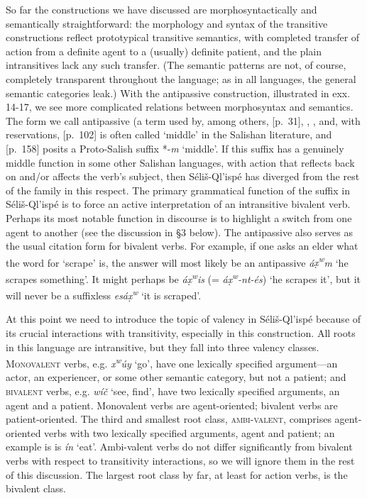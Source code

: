 \documentclass[output=paper,colorlinks,citecolor=brown]{langscibook}
\begin{document}
So far the constructions we have discussed are morphosyntactically and
semantically straightforward: the morphology and syntax of the
transitive constructions reflect prototypical transitive semantics,
with completed transfer of action from a definite agent to a (usually)
definite patient, and the plain intransitives lack any such transfer.
(The semantic patterns are not, of course, completely transparent
throughout the language; as in all languages, the general semantic
categories leak.)  With the antipassive construction, illustrated in
exx. 14-17, we see more complicated relations between morphosyntax and
semantics.  The form we call antipassive (a term used by, among
others, \cite{Kroeber:1999}[p.~31], \cite{Darnell:1990}, \cite{Gerdts:1993}, and,
with reservations, \cite{Thompson&Thompson:1992}[p.~102] is often
called `middle' in the Salishan literature, and \cite{Newman:1980}[p.~158]
posits a Proto-Salish suffix *-\emph{m} `middle'.  If this suffix has a
genuinely middle function in some other Salishan languages, with
action that reflects back on and/or affects the verb's subject, then
S\'eli\v{s}-Ql'isp\'e has diverged from the rest of the family in this
respect.  The primary grammatical function of the suffix in
S\'eli\v{s}-Ql'isp\'e is to force an active interpretation of an
intransitive bivalent verb.  Perhaps its most notable function in
discourse is to highlight a switch from one agent to another (see the
discussion in \S 3 below).  The antipassive also serves as the usual
citation form for bivalent verbs.  For example, if one asks an elder
what the word for `scrape' is, the answer will most likely be an
antipassive \emph{\textglotstop\'a{\d{x}\textsuperscript w}m} `he
scrapes something'.  It might perhaps be \emph{\textglotstop\'a{\d{x}\textsuperscript w}is} (= \emph{\textglotstop\'a{\d{x}\textsuperscript w}-nt-\'es}) `he scrapes it',
but it will never be a suffixless \emph{es\textglotstop\'a\d{x}\textsuperscript w} `it is scraped'.

At this point we need to introduce the topic of valency in
S\'eli\v{s}-Ql'isp\'e because of its crucial interactions with
transitivity, especially in this construction.  All roots in this
language are intransitive, but they fall into three valency
classes. \textsc{Monovalent} verbs, e.g. \emph{x\textsuperscript w\'uy}
`go', have one lexically specified argument---an actor, an
experiencer, or some other semantic category, but not a patient; and
\textsc{bivalent} verbs, e.g. \emph{w\'i\v{c}} `see, find', have two
lexically specified arguments, an agent and a patient.  Monovalent
verbs are agent-oriented; bivalent verbs are patient-oriented.  The
third and smallest root class, \textsc{ambi-valent}, comprises\newline
agent-oriented verbs with two lexically specified arguments, agent and
patient; an example is is \emph{\textglotstop\'i{\textltilde}n} `eat'.
Ambi-valent verbs do not differ significantly from bivalent verbs with
respect to transitivity interactions, so we will ignore them in the
rest of this discussion.  The largest root class by far, at least for
action verbs, is the bivalent class.
\end{document}
